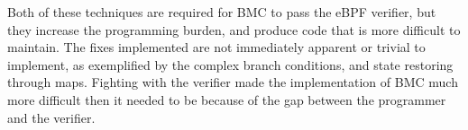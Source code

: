 

Both of these techniques are required for BMC to pass the eBPF verifier, but they
    increase the programming burden, and produce code that is more difficult
    to maintain.
The fixes implemented are not immediately apparent or trivial to implement, as
    exemplified by the complex branch conditions, and state restoring through maps.
Fighting with the verifier made the implementation of BMC much more difficult then
    it needed to be because of the gap between the programmer and the verifier.

